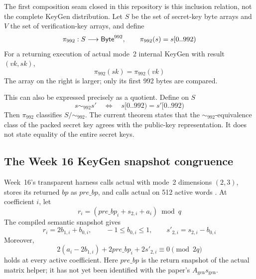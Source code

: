 The first composition seam closed in this repository is this inclusion
relation, not the complete KeyGen distribution.
Let \(S\) be the set of secret-key byte arrays and \(V\) the set of
verification-key arrays, and define
\[
  \pi_{992}:S\longrightarrow \mathsf{Byte}^{992},\qquad
  \pi_{992}(s)=s[0..992)
\]
For a returning execution of actual mode~2 internal KeyGen with result
\((vk,sk)\),
\[
  \pi_{992}(sk)=\pi_{992}(vk)
\]
The array on the right is larger; only its first 992 bytes are compared.

This can also be expressed precisely as a quotient. Define on \(S\)
\[
  s\sim_{992}s'\quad\Longleftrightarrow\quad
  s[0..992)=s'[0..992)
\]
Then \(\pi_{992}\) classifies \(S/{\sim_{992}}\).
The current theorem states that the \(\sim_{992}\)-equivalence class of the
packed secret key agrees with the public-key representation. It does not
state equality of the entire secret keys.

\subsection{The Week 16 KeyGen snapshot congruence}

Week~16's transparent harness
 calls actual
 with mode~2 dimensions \((2,3)\), stores its
returned \(bp\) as \(\mathit{pre\_bp}\), and calls actual
 on 512 active words
\cite{week16-mincore-plan,week16-kg-report,week16-kg-ntt-mul-report}.
At coefficient \(i\), let
\[
  r_i=(\mathit{pre\_bp}_i+s_{2,i}+a_i)\bmod q
\]
The compiled semantic snapshot gives
\[
  r_i=2b_{1,i}+b_{0,i},\qquad -1\le b_{0,i}\le1,
  \qquad s'_{2,i}=s_{2,i}-b_{0,i}
\]
Moreover,
\[
  2(a_i-2b_{1,i})+2\mathit{pre\_bp}_i+2s'_{2,i}
  \equiv0\pmod{2q}
\]
holds at every active coefficient. Here \(\mathit{pre\_bp}\) is the return
snapshot of the actual matrix helper; it has not yet been identified with
the paper's \(A_{\mathrm{gen}}s_{\mathrm{gen}}\).

